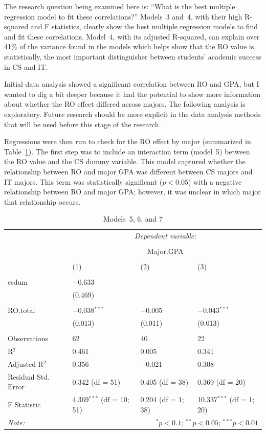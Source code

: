 The research question being examined here is: ``What is the best multiple regression model to fit these correlations?'' Models~3 and~4, with their high R-squared and F statistics, clearly show the best multiple regression models to find and fit these correlations. Model~4, with its adjusted R-squared, can explain over 41\% of the variance found in the models which helps show that the RO value is, statistically, the most important distinguisher between students' academic success in CS and IT.

Initial data analysis showed a significant correlation between RO and GPA, but I wanted to dig a bit deeper because it had the potential to show more information about whether the RO effect differed across majors. The following analysis is exploratory. Future research should be more explicit in the data analysis methods that will be used before this stage of the research.

Regressions were then run to check for the RO effect by major (summarized in Table~\ref{tab:model567}). The first step was to include an interaction term (model~5) between the RO value and the CS dummy variable. This model captured whether the relationship between RO and major GPA was different between CS majors and IT majors. This term was statistically significant ($p<0.05$) with a negative relationship between RO and major GPA; however, it was unclear in which major that relationship occurs.

\begin{table}[!htbp] \centering
  \caption[Model 5 6 7]{Models~5, 6, and 7}
  \label{tab:model567}
  \begin{tabular}{@{\extracolsep{5pt}}llll}
    \toprule
     & \multicolumn{3}{c}{\textit{Dependent variable:}} \\
    \cline{2-4}
    \\[-1.8ex] & \multicolumn{3}{c}{Major.GPA} \\
    \\[-1.8ex] & (1) & (2) & (3)\\
    \hline \\[-1.8ex]
    csdum & $-$0.633 &  &  \\
      & (0.469) &  &  \\
      & & & \\
    RO.total & $-$0.038$^{***}$ & $-$0.005 & $-$0.043$^{***}$ \\
      & (0.013) & (0.011) & (0.013) \\
      & & & \\
    \midrule
    Observations & 62 & 40 & 22 \\
    R$^{2}$ & 0.461 & 0.005 & 0.341 \\
    Adjusted R$^{2}$ & 0.356 & $-$0.021 & 0.308 \\
    Residual Std. Error & 0.342 (df = 51) & 0.405 (df = 38) & 0.369 (df = 20) \\
    F Statistic & 4.369$^{***}$ (df = 10; 51) & 0.204 (df = 1; 38) & 10.337$^{***}$ (df = 1; 20) \\
    \bottomrule
    \textit{Note:}  & \multicolumn{3}{r}{$^{*}p<0.1$; $^{**}p<0.05$; $^{***}p<0.01$} \\
  \end{tabular}
\end{table}

